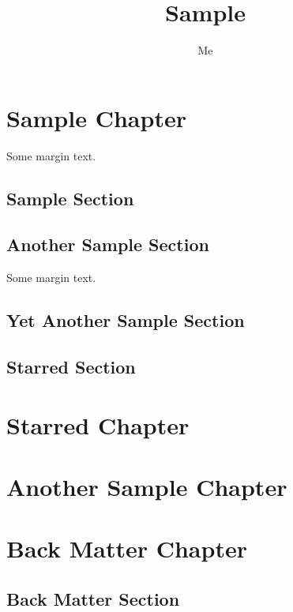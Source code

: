\documentclass[twoside]{book}
\title{Sample}
\author{Me}
\begin{document}
\maketitle

\frontmatter
\tableofcontents

\mainmatter
\enablethumbtabs

\chapter[Samp Chap]{Sample Chapter}

Some margin text.\marginpar[\hfill $\rightarrow$]{$\leftarrow$}
\lipsum[1]

\section[Samp Sec]{Sample Section}

\lipsum[2-3]

\section[Another Sec]{Another Sample Section}

Some margin text.\marginpar[\hfill $\rightarrow$]{$\leftarrow$}
\lipsum[4-50]

\section[Yet Another Sec]{Yet Another Sample Section}

\lipsum[1-20]

\section*[Star Sec][Sec*]{Starred Section}

\lipsum[21-30]

\chapter*
 [Star Cha]
 [Cha*]
 {Starred Chapter}

\lipsum[31-50]

\chapter[Another Chap (TOC)][Another Chap (Thumb)]{Another Sample Chapter}

\lipsum[1-20]

\backmatter
\chapter{Back Matter Chapter}

\lipsum

\section{Back Matter Section}

\lipsum[11-20]
\end{document}
